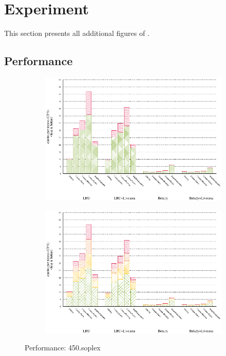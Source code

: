 \section{Experiment}\label{app:experiment}

This section presents all additional figures of .

\subsection{Performance}\label{app:experiment-performance}

\begin{figure}[!ht]
    \begin{subfigure}[b]{0.5\textwidth}%
    \includegraphics[width=\textwidth]{figs/plots/perf-misses-450-soplex.eps}
  \end{subfigure}%
  \begin{subfigure}[b]{0.5\textwidth}%
    \includegraphics[width=\textwidth]{figs/plots/perf-450-soplex.eps}
  \end{subfigure}%
  \caption{Performance: 450.soplex}
  \label{fig:performance-450-soplex}
\end{figure}

